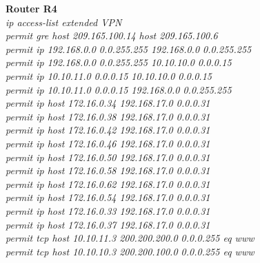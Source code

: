 \documentclass[a4paper, 12pt]{article}
\begin{document}
\hspace*{1cm}\textbf{Router R4}	\\
\hspace*{2cm}\textit{ip access-list extended VPN\\
\hspace*{2cm}permit gre host 209.165.100.14 host 209.165.100.6\\
\hspace*{2cm}permit ip 192.168.0.0 0.0.255.255 192.168.0.0 0.0.255.255\\
\hspace*{2cm}permit ip 192.168.0.0 0.0.255.255 10.10.10.0 0.0.0.15\\
\hspace*{2cm}permit ip 10.10.11.0 0.0.0.15 10.10.10.0 0.0.0.15\\
\hspace*{2cm}permit ip 10.10.11.0 0.0.0.15 192.168.0.0 0.0.255.255\\
\hspace*{2cm}permit ip host 172.16.0.34 192.168.17.0 0.0.0.31\\
\hspace*{2cm}permit ip host 172.16.0.38 192.168.17.0 0.0.0.31\\
\hspace*{2cm}permit ip host 172.16.0.42 192.168.17.0 0.0.0.31\\
\hspace*{2cm}permit ip host 172.16.0.46 192.168.17.0 0.0.0.31\\
\hspace*{2cm}permit ip host 172.16.0.50 192.168.17.0 0.0.0.31\\
\hspace*{2cm}permit ip host 172.16.0.58 192.168.17.0 0.0.0.31\\
\hspace*{2cm}permit ip host 172.16.0.62 192.168.17.0 0.0.0.31\\
\hspace*{2cm}permit ip host 172.16.0.54 192.168.17.0 0.0.0.31\\
\hspace*{2cm}permit ip host 172.16.0.33 192.168.17.0 0.0.0.31\\
\hspace*{2cm}permit ip host 172.16.0.37 192.168.17.0 0.0.0.31\\
\hspace*{2cm}permit tcp host 10.10.11.3 200.200.200.0 0.0.0.255 eq www\\
\hspace*{2cm}permit tcp host 10.10.10.3 200.200.100.0 0.0.0.255 eq www\\}
\end{document}

